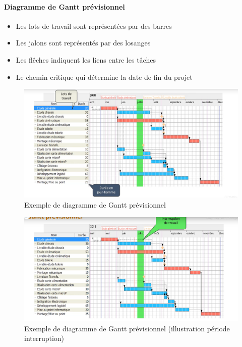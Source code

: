 \paragraph*{Diagramme de Gantt prévisionnel}
\begin{itemize}
	\item Les lots de travail sont représentées par des barres
	\item Les jalons sont représentés par des losanges
	\item Les flêches indiquent les liens entre les tâches
	\item Le chemin critique qui détermine la date de fin du projet
\end{itemize}
\begin{figure}[!h]
	\begin{center}
		\includegraphics[scale=0.2]{images/exemple_diagramme_gantt.png}
		\caption{Exemple de diagramme de Gantt prévisionnel}
	\end{center}
\end{figure}
\begin{figure}[!h]
	\begin{center}
		\includegraphics[scale=0.2]{images/exemple_diagramme_gantt1.png}
		\caption{Exemple de diagramme de Gantt prévisionnel (illustration période interruption)}
	\end{center}
\end{figure}
